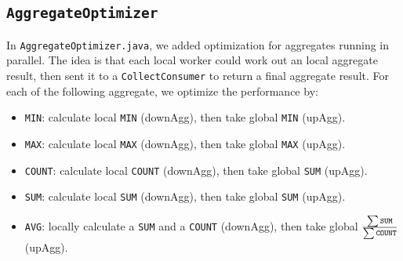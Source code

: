 \documentclass[12pt]{myland}
\def\<#1>{\texttt{#1}}
\begin{document}
    \subsection{\<AggregateOptimizer>}
    In \<AggregateOptimizer.java>, we added optimization for aggregates running in parallel. The idea is that each local
    worker could work out an local aggregate result, then sent it to a \<CollectConsumer> to return a final aggregate
    result. For each of the following aggregate, we optimize the performance by:
    \begin{itemize}
        \item \<MIN>: calculate local \<MIN> (downAgg), then take global \<MIN> (upAgg).
        \item \<MAX>: calculate local \<MAX> (downAgg), then take global \<MAX> (upAgg).
        \item \<COUNT>: calculate local \<COUNT> (downAgg), then take global \<SUM> (upAgg).
        \item \<SUM>: calculate local \<SUM> (downAgg), then take global \<SUM> (upAgg).
        \item \<AVG>: locally calculate a \<SUM> and a \<COUNT> (downAgg), then take global
            $\frac{\sum\text{\<SUM>}}{\sum\text{\<COUNT>}}$ (upAgg).
    \end{itemize}
\end{document}

